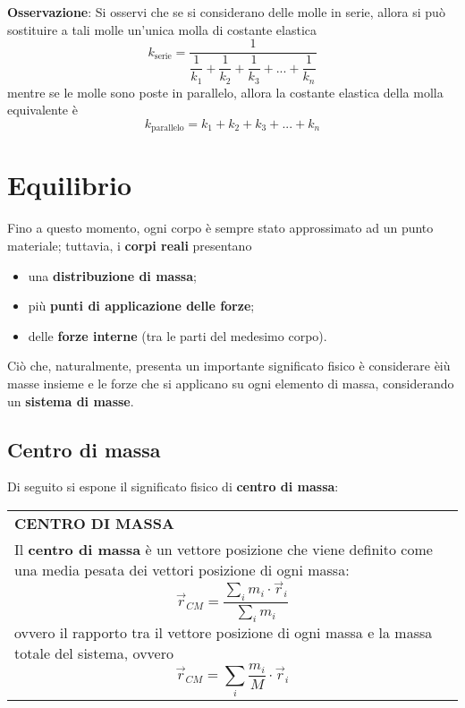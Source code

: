 \documentclass[a4paper]{extarticle}
\renewcommand\arraystretch{}
\begin{document}
\vspace{1em}
\noindent
\textbf{Osservazione}: Si osservi che se si considerano delle molle in serie, allora si può sostituire a tali molle un'unica molla di costante elastica
\[\boxed{k_{\text{serie}}=\dfrac{1}{\dfrac{1}{k_1}+\dfrac{1}{k_2}+\dfrac{1}{k_3}+...+\dfrac{1}{k_n}}}\]
mentre se le molle sono poste in parallelo, allora la costante elastica della molla equivalente è
\[\boxed{k_{\text{parallelo}}=k_1+k_2+k_3+...+k_n}\]

\newpage
\section{Equilibrio}
Fino a questo momento, ogni corpo è sempre stato approssimato ad un punto materiale; tuttavia, i \textbf{corpi reali} presentano
\begin{itemize}
  \item una \textbf{distribuzione di massa};
  \item più \textbf{punti di applicazione delle forze};
  \item delle \textbf{forze interne} (tra le parti del medesimo corpo).
\end{itemize}
Ciò che, naturalmente, presenta un importante significato fisico è considerare èiù masse insieme e le forze che si applicano su ogni elemento di massa, considerando un \textbf{sistema di masse}.

\vspace{1em}
\subsection{Centro di massa}
Di seguito si espone il significato fisico di \textbf{centro di massa}:

\vspace{1em}
\setlength{\tabcolsep}{14pt}
\renewcommand{\arraystretch}{2}
\noindent
\begin{tabularx}{\textwidth}{@{}|P|@{}}
    \hline
    {\textbf{CENTRO DI MASSA}}\\
    \parbox{\linewidth}{Il \textbf{centro di massa} è un vettore posizione che viene definito come una media pesata dei vettori posizione di ogni massa:
    \[\boxed{\vec r_{CM} = \frac{\displaystyle{\sum_i m_i \cdot \vec r_i}}{\displaystyle{\sum_i m_i}}}\]
    ovvero il rapporto tra il vettore posizione di ogni massa e la massa totale del sistema, ovvero
    \[\vec r_{CM} = \sum_i \frac{m_i}{M} \cdot \vec r_i\]
    \vspace{-1mm}}\\
    \hline
\end{tabularx}
\end{document}
